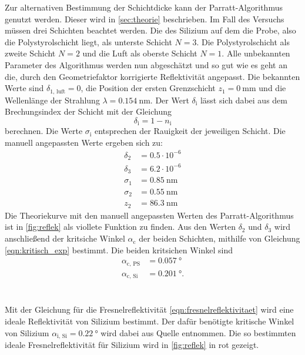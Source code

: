 Zur alternativen Bestimmung der Schichtdicke kann der Parratt-Algorithmus genutzt werden.
Dieser wird in \autoref{sec:theorie} beschrieben.
Im Fall des Versuchs müssen drei Schichten beachtet werden.
Die des Silizium auf dem die Probe, also die Polystyrolschicht liegt, als unterste Schicht $N=3$.
Die Polystyrolschicht als zweite Schicht $N=2$ und die Luft als oberste Schicht $N=1$.
Alle unbekannten Parameter des Algorithmus werden nun abgeschätzt und so gut wie es geht an die, durch den Geometriefaktor korrigierte Reflektivität angepasst.
Die bekannten Werte sind $\delta_\text{1, luft} = 0$, die Position der ersten Grenzschicht $z_1= \SI{0}{\milli\meter}$ und die Wellenlänge der Strahlung $\lambda =\SI{0.154}{\nano\meter}$.
Der Wert $\delta_\text{i}$ lässt sich dabei aus dem Brechungsindex der Schicht mit der Gleichung
\begin{equation}
    \delta_\text{i} = 1- n_\text{i}
\end{equation}
berechnen.
Die Werte $\sigma_\text{i}$ entsprechen der Rauigkeit der jeweiligen Schicht.
Die manuell angepassten Werte ergeben sich zu:
\begin{align*}
    \delta_2 &= 0.5\cdot10^{-6}        \\ 
    \delta_3 &= 6.2\cdot10^{-6}        \\ 
    \sigma_1 &= \SI{0.85}{\nano\meter} \\ 
    \sigma_2 &= \SI{0.55}{\nano\meter} \\ 
    z_2 &= \SI{86.3}{\nano\meter}
\end{align*}
Die Theoriekurve mit den manuell angepassten Werten des Parratt-Algorithmus ist in \autoref{fig:reflek} als viollete Funktion zu finden.
Aus den Werten $\delta_2$ und $\delta_3$ wird anschließend der kritsiche Winkel $\alpha_\text{c}$ der beiden Schichten, mithilfe von Gleichung \eqref{eqn:kritisch_exp} bestimmt.
Die beiden kritsichen Winkel sind 
\begin{align*}
    \alpha_\text{c, PS} &= \SI{0.057}{\degree}\\
    \alpha_\text{c, Si} &= \SI{0.201}{\degree}.
\end{align*}
\\\\
Mit der Gleichung für die Fresnelreflektivität \eqref{eqn:fresnelreflektivitaet} wird eine ideale Reflektivität von Silizium bestimmt.
Der dafür benötigte kritische Winkel von Silizium $\alpha_\text{i, Si} = \SI{0.22}{\degree}$ wird dabei aus Quelle \cite[8]{alte_anleitung} entnommen.
Die so bestimmten ideale Fresnelreflektivität für Silizium wird in \autoref{fig:reflek} in rot gezeigt.
